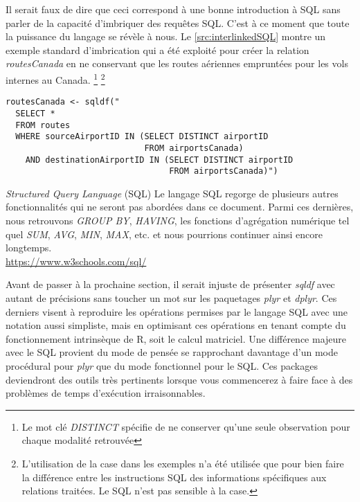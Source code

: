 \vspace{\baselineskip}
\noindent
Il serait faux de dire que ceci correspond à une bonne introduction à SQL sans parler de la capacité d'imbriquer des requêtes SQL. C'est à ce moment que toute la puissance du langage se révèle à nous. Le \autoref{src:interlinkedSQL} montre un exemple standard d'imbrication qui a été exploité pour créer la relation \emph{routesCanada} en ne conservant que les routes aériennes empruntées pour les vols internes au Canada. \footnote{Le mot clé \emph{DISTINCT} spécifie de ne conserver qu'une seule observation pour chaque modalité retrouvée} \footnote{L'utilisation de la case dans les exemples n'a été utilisée que pour bien faire la différence entre les instructions SQL des informations spécifiques aux relations traitées. Le SQL n'est pas sensible à la case.}

\begin{lstlisting}[caption = Fonctionnalités avancées de SQL,label=src:interlinkedSQL]
routesCanada <- sqldf("
  SELECT *
  FROM routes
  WHERE sourceAirportID IN (SELECT DISTINCT airportID
                            FROM airportsCanada)
    AND destinationAirportID IN (SELECT DISTINCT airportID
                                 FROM airportsCanada)")                           
\end{lstlisting}

\begin{moreInfo}{\emph{Structured Query Language} (SQL)}
	Le langage SQL regorge de plusieurs autres fonctionnalités qui ne seront pas abordées dans ce document. Parmi ces dernières, nous retrouvons \emph{GROUP BY}, \emph{HAVING}, les fonctions d'agrégation numérique tel quel \emph{SUM}, \emph{AVG}, \emph{MIN}, \emph{MAX}, etc. et nous pourrions continuer ainsi encore longtemps. \\
	\url{https://www.w3schools.com/sql/}
\end{moreInfo}

\noindent
Avant de passer à la prochaine section, il serait injuste de présenter \emph{sqldf} avec autant de précisions sans toucher un mot sur les paquetages \emph{plyr} et \emph{dplyr}. Ces derniers visent à reproduire les opérations permises par le langage SQL avec une notation aussi simpliste, mais en optimisant ces opérations en tenant compte du fonctionnement intrinsèque de R, soit le calcul matriciel. Une différence majeure avec le SQL provient du mode de pensée se rapprochant davantage d'un mode procédural pour \emph{plyr} que du mode fonctionnel pour le SQL. Ces packages deviendront des outils très pertinents lorsque vous commencerez à faire face à des problèmes de temps d'exécution irraisonnables.

